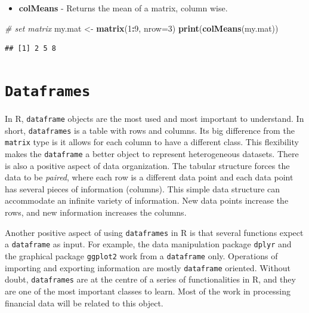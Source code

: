 \documentclass[11pt,]{book}
\newenvironment{Shaded}{\begin{snugshade}}{\end{snugshade}}
\newcommand{\KeywordTok}[1]{\textcolor[rgb]{0.27,0.27,0.27}{\textbf{#1}}}
\newcommand{\DataTypeTok}[1]{\textcolor[rgb]{0.27,0.27,0.27}{#1}}
\newcommand{\DecValTok}[1]{\textcolor[rgb]{0.06,0.06,0.06}{#1}}
\newcommand{\StringTok}[1]{\textcolor[rgb]{0.5,0.5,0.5}{#1}}
\newcommand{\CommentTok}[1]{\textcolor[rgb]{0.56,0.35,0.01}{\textit{#1}}}
\newcommand{\OperatorTok}[1]{\textcolor[rgb]{0.81,0.36,0.00}{\textbf{#1}}}
\newcommand{\NormalTok}[1]{#1}
\providecommand{\tightlist}{%
  \setlength{\itemsep}{0pt}\setlength{\parskip}{0pt}}
\begin{document}
\begin{itemize}
\tightlist
\item
  \textbf{colMeans} - Returns the mean of a matrix, column wise.
\end{itemize}

\begin{Shaded}
\begin{Highlighting}[]
\CommentTok{# set matrix}
\NormalTok{my.mat <-}\StringTok{ }\KeywordTok{matrix}\NormalTok{(}\DecValTok{1}\OperatorTok{:}\DecValTok{9}\NormalTok{, }\DataTypeTok{nrow=}\DecValTok{3}\NormalTok{)}
\KeywordTok{print}\NormalTok{(}\KeywordTok{colMeans}\NormalTok{(my.mat))}
\end{Highlighting}
\end{Shaded}

\begin{verbatim}
## [1] 2 5 8
\end{verbatim}

\section{\texorpdfstring{\texttt{Dataframes}}{Dataframes}}\label{dataframes}

In R, \texttt{dataframe} objects are the most used and most important to
understand. In short, \texttt{dataframes} is a table with rows and
columns. Its big difference from the \texttt{matrix} type is it allows
for each column to have a different class. This flexibility makes the
\texttt{dataframe} a better object to represent heterogeneous datasets.
There is also a positive aspect of data organization. The tabular
structure forces the data to be \emph{paired}, where each row is a
different data point and each data point has several pieces of
information (columns). This simple data structure can accommodate an
infinite variety of information. New data points increase the rows, and
new information increases the columns. 

Another positive aspect of using \texttt{dataframes} in R is that
several functions expect a \texttt{dataframe} as input. For example, the
data manipulation package \texttt{dplyr} and the graphical package
\texttt{ggplot2} work from a \texttt{dataframe} only. Operations of
importing and exporting information are mostly \texttt{dataframe}
oriented. Without doubt, \texttt{dataframes} are at the centre of a
series of functionalities in R, and they are one of the most important
classes to learn. Most of the work in processing financial data will be
related to this object.
\end{document}
